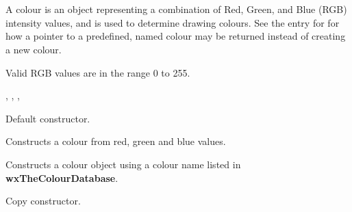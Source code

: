 \section{}\label{wxcolour}

A colour is an object representing a combination of Red, Green, and Blue (RGB) intensity values,
and is used to determine drawing colours. See the
entry for  for how a pointer to a predefined,
named colour may be returned instead of creating a new colour.

Valid RGB values are in the range 0 to 255.




, , ,\rtfsp
{}


\label{wxcolourconstr}


Default constructor.


Constructs a colour from red, green and blue values.


Constructs a colour object using a colour name
listed in {\bf wxTheColourDatabase}.


Copy constructor.









